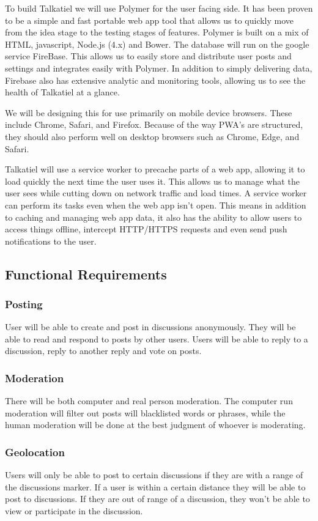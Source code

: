 \documentclass[12pt]{article}
\begin{document}
	To build Talkatiel we will use Polymer for the user facing side.  It has been proven to be a simple and fast portable web app tool that allows us to quickly move from the idea stage to the testing stages of features.  Polymer is built on a mix of HTML, javascript, Node.js (4.x) and Bower.  The database will run on the google service FireBase.  This allows us to easily store and distribute user posts and settings and integrates easily with Polymer.  In addition to simply delivering data, Firebase also has extensive analytic and monitoring tools, allowing us to see the health of Talkatiel at a glance.

	We will be designing this for use primarily on mobile device browsers.  These include Chrome, Safari, and Firefox.  Because of the way PWA’s are structured, they should also perform well on desktop browsers such as Chrome, Edge, and Safari.

  Talkatiel will use a service worker to precache parts of a web app, allowing it to load quickly the next time the user uses it.  This allows us to manage what the user sees while cutting down on network traffic and load times.  A service worker can perform its tasks even when the web app isn’t open.  This means in addition to caching and managing web app data, it also has the ability to allow users to access things offline, intercept HTTP/HTTPS requests and even send push notifications to the user.
\subsection{Functional Requirements}
\subsubsection{Posting}
User will be able to create and post in discussions anonymously.  They will be able to read and respond to posts by other users.  Users will be able to reply to a discussion, reply to another reply and vote on posts.
\subsubsection{Moderation}
There will be both computer and real person moderation.  The computer run moderation will filter out posts will blacklisted words or phrases, while the human moderation will be done at the best judgment of whoever is moderating.
\subsubsection{Geolocation}
Users will only be able to post to certain discussions if they are with a range of the discussions marker.  If a user is within a certain distance they will be able to post to discussions.  If they are out of range of a discussion, they won’t be able to view or participate in the discussion.
\end{document}

